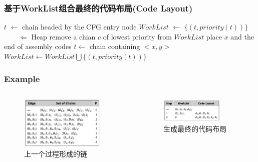 \begin{frame}
    \frametitle{基于WorkList组合最终的代码布局(Code Layout)}

    \begin{algorithmic}
        \State $t$ $\gets$ chain headed by the CFG entry node
        \State $WorkList$ $\gets$ $\lbrace(t, priority(t))\rbrace$ $ \qquad \Leftarrow$ Heap\cite{forsythe1964algorithms}
        \State remove a chian $c$ of lowest priority from $WorkList$
        \State place $x$ and the end of assembly codes
        \EndFor
        \State $t \gets $ chain containing $<x, y>$
        $WorkList \gets WorkList \bigcup \lbrace (t, priority(t)) \rbrace$
        \EndIf
        \EndFor
        \EndFor
        \EndWhile
    \end{algorithmic}

\end{frame}


\begin{frame}
    \frametitle{Example}
    \begin{columns}
        \begin{column}{0.5\textwidth}
            \begin{figure}
                \centering
                \includegraphics[width=0.86\textwidth]{images/greedy.png}
                \caption{上一个过程形成的链}
            \end{figure}
        \end{column}
        \begin{column}{0.5\textwidth}
            \begin{figure}
                \centering
                \includegraphics[width=0.78\textwidth]{images/worklist.png}
                \caption{生成最终的代码布局}
            \end{figure}
        \end{column}
    \end{columns}
\end{frame}